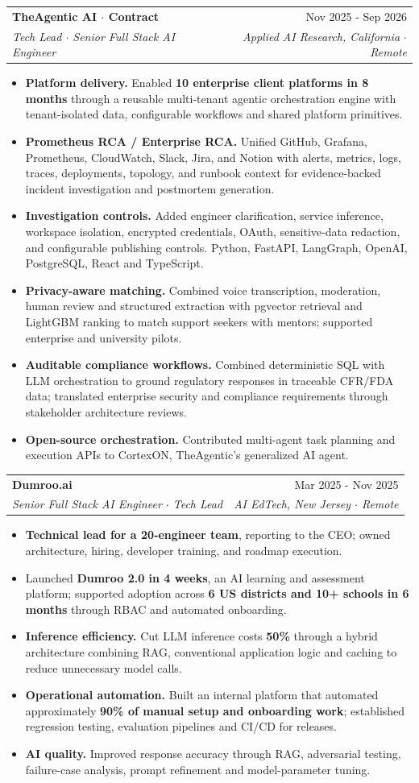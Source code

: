 \documentclass[letterpaper,11pt]{article}
\makeatletter
\newcommand{\resumeItem}[1]{
  \item\small{
    {#1 \vspace{-2pt}}
  }
}
\newcommand{\resumeSubheading}[4]{
  \vspace{-2pt}\item
    \begin{tabular*}{0.97\textwidth}[t]{l@{\extracolsep{\fill}}r}
      \textbf{#1} & #2 \\
      \textit{\small#3} & \textit{\small #4} \\
    \end{tabular*}\vspace{-7pt}
}
\newcommand{\resumeItemListStart}{\begin{itemize}}
\newcommand{\resumeItemListEnd}{\end{itemize}\vspace{-5pt}}
\newcommand{\sep}{\(\cdot\)}
\makeatother
\begin{document}
    \resumeSubheading
      {TheAgentic AI \sep{} Contract}{Nov 2025 - Sep 2026}
      {Tech Lead \sep{} Senior Full Stack AI Engineer}{Applied AI Research, California \sep{} Remote}
      \resumeItemListStart
        \resumeItem{\textbf{Platform delivery.} Enabled \textbf{10 enterprise client platforms in 8 months} through a reusable multi-tenant agentic orchestration engine with tenant-isolated data, configurable workflows and shared platform primitives.}
        \resumeItem{\textbf{Prometheus RCA / Enterprise RCA.} Unified GitHub, Grafana, Prometheus, CloudWatch, Slack, Jira, and Notion with alerts, metrics, logs, traces, deployments, topology, and runbook context for evidence-backed incident investigation and postmortem generation.}
        \resumeItem{\textbf{Investigation controls.} Added engineer clarification, service inference, workspace isolation, encrypted credentials, OAuth, sensitive-data redaction, and configurable publishing controls. Python, FastAPI, LangGraph, OpenAI, PostgreSQL, React and TypeScript.}
        \resumeItem{\textbf{Privacy-aware matching.} Combined voice transcription, moderation, human review and structured extraction with pgvector retrieval and LightGBM ranking to match support seekers with mentors; supported enterprise and university pilots.}
        \resumeItem{\textbf{Auditable compliance workflows.} Combined deterministic SQL with LLM orchestration to ground regulatory responses in traceable CFR/FDA data; translated enterprise security and compliance requirements through stakeholder architecture reviews.}
        \resumeItem{\textbf{Open-source orchestration.} Contributed multi-agent task planning and execution APIs to CortexON, TheAgentic's generalized AI agent.}
      \resumeItemListEnd

    \resumeSubheading
      {Dumroo.ai}{Mar 2025 - Nov 2025}
      {Senior Full Stack AI Engineer \sep{} Tech Lead}{AI EdTech, New Jersey \sep{} Remote}
      \resumeItemListStart
        \resumeItem{\textbf{Technical lead for a 20-engineer team}, reporting to the CEO; owned architecture, hiring, developer training, and roadmap execution.}
        \resumeItem{Launched \textbf{Dumroo 2.0 in 4 weeks}, an AI learning and assessment platform; supported adoption across \textbf{6 US districts and 10+ schools in 6 months} through RBAC and automated onboarding.}
        \resumeItem{\textbf{Inference efficiency.} Cut LLM inference costs \textbf{50\%} through a hybrid architecture combining RAG, conventional application logic and caching to reduce unnecessary model calls.}
        \resumeItem{\textbf{Operational automation.} Built an internal platform that automated approximately \textbf{90\% of manual setup and onboarding work}; established regression testing, evaluation pipelines and CI/CD for releases.}
        \resumeItem{\textbf{AI quality.} Improved response accuracy through RAG, adversarial testing, failure-case analysis, prompt refinement and model-parameter tuning.}
      \resumeItemListEnd
\end{document}
